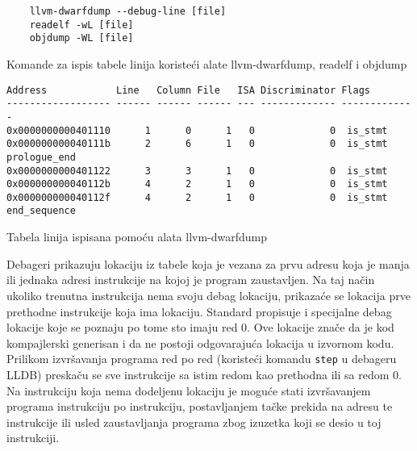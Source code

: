 \documentclass[12pt,oneside]{memoir}
\begin{document}
\begin{listing}
  \begin{verbatim}
    llvm-dwarfdump --debug-line [file]
    readelf -wL [file]
    objdump -WL [file]
  \end{verbatim}
  \label{lst:debug_line_commands}
  \caption{Komande za ispis tabele linija koristeći alate llvm-dwarfdump, readelf i objdump}
\end{listing}

\begin{listing}
  \begin{verbatim}
Address            Line   Column File   ISA Discriminator Flags
------------------ ------ ------ ------ --- ------------- -------------
0x0000000000401110      1      0      1   0             0  is_stmt
0x000000000040111b      2      6      1   0             0  is_stmt prologue_end
0x0000000000401122      3      3      1   0             0  is_stmt
0x000000000040112b      4      2      1   0             0  is_stmt
0x000000000040112f      4      2      1   0             0  is_stmt end_sequence
  \end{verbatim}
  \label{lst:line_table}
  \caption{Tabela linija ispisana pomoću alata llvm-dwarfdump}
\end{listing}


Debageri prikazuju lokaciju iz tabele koja je vezana za prvu adresu koja je manja ili jednaka adresi instrukcije na kojoj je program zaustavljen.
Na taj način ukoliko trenutna instrukcija nema svoju debag lokaciju, prikazaće se lokacija prve prethodne instrukcije koja ima lokaciju.
Standard propisuje i specijalne debag lokacije koje se poznaju po tome sto imaju red 0.
Ove lokacije znače da je kod kompajlerski generisan i da ne postoji odgovarajuća lokacija u izvornom kodu.
Prilikom izvršavanja programa red po red (koristeći komandu \verb|step| u debageru LLDB) preskaču se sve instrukcije sa istim redom kao prethodna ili sa redom 0. 
Na instrukciju koja nema dodeljenu lokaciju je moguće stati izvršavanjem programa instrukciju po instrukciju, postavljanjem tačke prekida na adresu te instrukcije ili usled zaustavljanja programa zbog izuzetka koji se desio u toj instrukciji.

\end{document}
